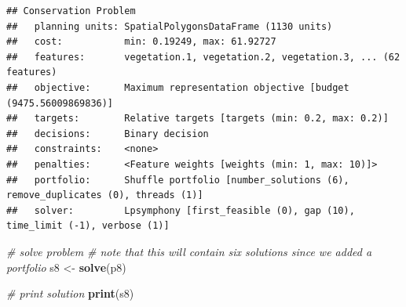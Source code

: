 \documentclass[12pt,]{book}
\newenvironment{Shaded}{\begin{snugshade}}{\end{snugshade}}
\newcommand{\KeywordTok}[1]{\textcolor[rgb]{0.13,0.29,0.53}{\textbf{#1}}}
\newcommand{\DataTypeTok}[1]{\textcolor[rgb]{0.13,0.29,0.53}{#1}}
\newcommand{\DecValTok}[1]{\textcolor[rgb]{0.00,0.00,0.81}{#1}}
\newcommand{\FloatTok}[1]{\textcolor[rgb]{0.00,0.00,0.81}{#1}}
\newcommand{\StringTok}[1]{\textcolor[rgb]{0.31,0.60,0.02}{#1}}
\newcommand{\CommentTok}[1]{\textcolor[rgb]{0.56,0.35,0.01}{\textit{#1}}}
\newcommand{\OtherTok}[1]{\textcolor[rgb]{0.56,0.35,0.01}{#1}}
\newcommand{\OperatorTok}[1]{\textcolor[rgb]{0.81,0.36,0.00}{\textbf{#1}}}
\newcommand{\NormalTok}[1]{#1}
\begin{document}
\begin{Shaded}
\end{Shaded}

\begin{verbatim}
## Conservation Problem
##   planning units: SpatialPolygonsDataFrame (1130 units)
##   cost:           min: 0.19249, max: 61.92727
##   features:       vegetation.1, vegetation.2, vegetation.3, ... (62 features)
##   objective:      Maximum representation objective [budget (9475.56009869836)]
##   targets:        Relative targets [targets (min: 0.2, max: 0.2)]
##   decisions:      Binary decision 
##   constraints:    <none>
##   penalties:      <Feature weights [weights (min: 1, max: 10)]>
##   portfolio:      Shuffle portfolio [number_solutions (6), remove_duplicates (0), threads (1)]
##   solver:         Lpsymphony [first_feasible (0), gap (10), time_limit (-1), verbose (1)]
\end{verbatim}

\begin{Shaded}
\begin{Highlighting}[]
\CommentTok{# solve problem}
\CommentTok{# note that this will contain six solutions since we added a portfolio}
\NormalTok{s8 <-}\StringTok{ }\KeywordTok{solve}\NormalTok{(p8)}

\CommentTok{# print solution}
\KeywordTok{print}\NormalTok{(s8)}
\end{Highlighting}
\end{Shaded}
\end{document}
